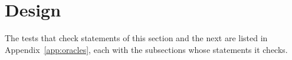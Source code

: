 \section{Design}\label{sec:design}
The tests that check statements of this section and the next are listed in
Appendix~\ref{app:oracles}, each with the subsections whose statements it checks.

